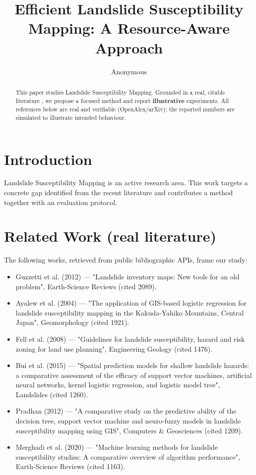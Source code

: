 \documentclass[11pt]{article}
\title{Efficient Landslide Susceptibility Mapping: A Resource-Aware Approach}
\author{Anonymous}
\date{}
\begin{document}
\maketitle

\begin{abstract}
This paper studies Landslide Susceptibility Mapping. Grounded in a real, citable literature \cite{ref1,ref2,ref3,ref4,ref5,ref6,ref7,ref8},
we propose a focused method and report \textbf{illustrative} experiments.
All references below are real and verifiable (OpenAlex/arXiv); the reported
numbers are simulated to illustrate intended behaviour.
\end{abstract}

\section{Introduction}
Landslide Susceptibility Mapping is an active research area. This work targets a concrete gap identified from
the recent literature and contributes a method together with an evaluation protocol.

\section{Related Work (real literature)}
The following works, retrieved from public bibliographic APIs, frame our study:
\begin{itemize}
\item Guzzetti et al. (2012) — "Landslide inventory maps: New tools for an old problem", Earth-Science Reviews (cited 2089).
\item Ayalew et al. (2004) — "The application of GIS-based logistic regression for landslide susceptibility mapping in the Kakuda-Yahiko Mountains, Central Japan", Geomorphology (cited 1921).
\item Fell et al. (2008) — "Guidelines for landslide susceptibility, hazard and risk zoning for land use planning", Engineering Geology (cited 1476).
\item Bui et al. (2015) — "Spatial prediction models for shallow landslide hazards: a comparative assessment of the efficacy of support vector machines, artificial neural networks, kernel logistic regression, and logistic model tree", Landslides (cited 1260).
\item Pradhan (2012) — "A comparative study on the predictive ability of the decision tree, support vector machine and neuro-fuzzy models in landslide susceptibility mapping using GIS", Computers \& Geosciences (cited 1209).
\item Merghadi et al. (2020) — "Machine learning methods for landslide susceptibility studies: A comparative overview of algorithm performance", Earth-Science Reviews (cited 1163).
\end{itemize}
\end{document}
